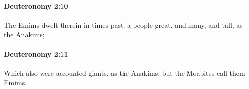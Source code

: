 		\paragraph{Deuteronomy 2:10} %
			\label{DEUTERONOMY-2-10}

			The Emims dwelt therein in times past, a people great, and many, and tall, as the Anakims;


		\paragraph{Deuteronomy 2:11} %
			\label{DEUTERONOMY-2-11}

			Which also were accounted giants, as the Anakims; but the Moabites call them Emims.


